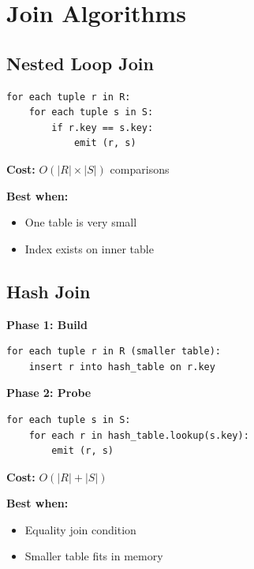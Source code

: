 \section{Join Algorithms}

\subsection{Nested Loop Join}

\begin{algorithmbox}
\begin{lstlisting}[language=pseudo]
for each tuple r in R:
    for each tuple s in S:
        if r.key == s.key:
            emit (r, s)
\end{lstlisting}

\textbf{Cost:} $O(|R| \times |S|)$ comparisons

\textbf{Best when:}
\begin{itemize}
    \item One table is very small
    \item Index exists on inner table
\end{itemize}
\end{algorithmbox}

\subsection{Hash Join}

\begin{algorithmbox}
\textbf{Phase 1: Build}
\begin{lstlisting}[language=pseudo]
for each tuple r in R (smaller table):
    insert r into hash_table on r.key
\end{lstlisting}

\textbf{Phase 2: Probe}
\begin{lstlisting}[language=pseudo]
for each tuple s in S:
    for each r in hash_table.lookup(s.key):
        emit (r, s)
\end{lstlisting}

\textbf{Cost:} $O(|R| + |S|)$

\textbf{Best when:}
\begin{itemize}
    \item Equality join condition
    \item Smaller table fits in memory
\end{itemize}
\end{algorithmbox}

